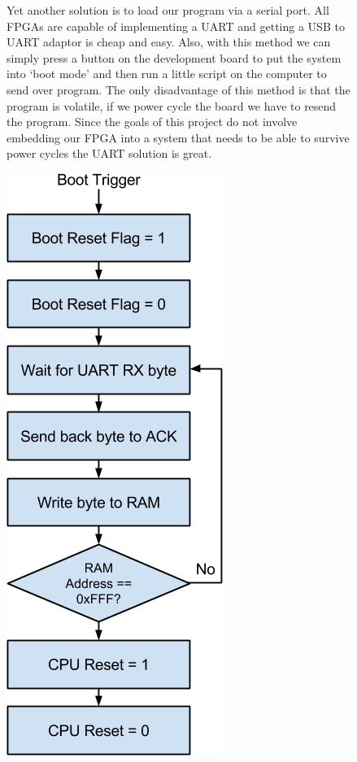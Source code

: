 \documentclass[10pt]{article}
\begin{document}
\begin{figure}[H]
\begin{minipage}[t]{.6\textwidth}
                \vspace{\baselineskip}
                Yet another solution is to load our
                program via a serial port. All FPGAs are capable of
                implementing a UART and getting a USB to UART adaptor is cheap
                and easy. Also, with this method we can simply press a button
                on the development board to put the system into `boot mode' and
                then run a little script on the computer to send over program.
                The only disadvantage of this method is that the program is
                volatile, if we power cycle the board we have to resend the
                program. Since the goals of this project do not involve
                embedding our FPGA into a system that needs to be able to
                survive power cycles the UART solution is great.
            \end{minipage}%
            \begin{minipage}[t]{.4\textwidth}
                \vspace{0pt}
                \centering
                \includegraphics[width=0.65\linewidth]{./bootloader.png}

\end{minipage}
\end{figure}
\end{document}
